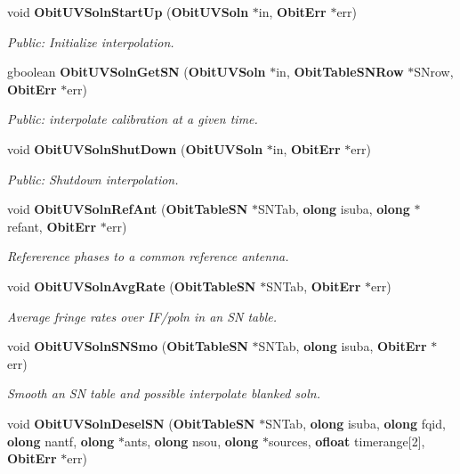 \begin{CompactItemize}
void {\bf Obit\-UVSoln\-Start\-Up} ({\bf Obit\-UVSoln} $\ast$in, {\bf Obit\-Err} $\ast$err)
\begin{CompactList}\small\item\em Public: Initialize interpolation. \item\end{CompactList}\item 
gboolean {\bf Obit\-UVSoln\-Get\-SN} ({\bf Obit\-UVSoln} $\ast$in, {\bf Obit\-Table\-SNRow} $\ast$SNrow, {\bf Obit\-Err} $\ast$err)
\begin{CompactList}\small\item\em Public: interpolate calibration at a given time. \item\end{CompactList}\item 
void {\bf Obit\-UVSoln\-Shut\-Down} ({\bf Obit\-UVSoln} $\ast$in, {\bf Obit\-Err} $\ast$err)
\begin{CompactList}\small\item\em Public: Shutdown interpolation. \item\end{CompactList}\item 
void {\bf Obit\-UVSoln\-Ref\-Ant} ({\bf Obit\-Table\-SN} $\ast$SNTab, {\bf olong} isuba, {\bf olong} $\ast$refant, {\bf Obit\-Err} $\ast$err)
\begin{CompactList}\small\item\em Refererence phases to a common reference antenna. \item\end{CompactList}\item 
void {\bf Obit\-UVSoln\-Avg\-Rate} ({\bf Obit\-Table\-SN} $\ast$SNTab, {\bf Obit\-Err} $\ast$err)
\begin{CompactList}\small\item\em Average fringe rates over IF/poln in an SN table. \item\end{CompactList}\item 
void {\bf Obit\-UVSoln\-SNSmo} ({\bf Obit\-Table\-SN} $\ast$SNTab, {\bf olong} isuba, {\bf Obit\-Err} $\ast$err)
\begin{CompactList}\small\item\em Smooth an SN table and possible interpolate blanked soln. \item\end{CompactList}\item 
void {\bf Obit\-UVSoln\-Desel\-SN} ({\bf Obit\-Table\-SN} $\ast$SNTab, {\bf olong} isuba, {\bf olong} fqid, {\bf olong} nantf, {\bf olong} $\ast$ants, {\bf olong} nsou, {\bf olong} $\ast$sources, {\bf ofloat} timerange[2], {\bf Obit\-Err} $\ast$err)

\end{CompactItemize}
